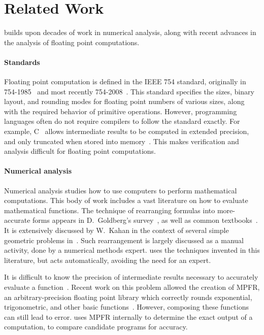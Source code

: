 \documentclass[paper.tex]{subfiles}
\begin{document}
\section{Related Work}
\label{sec:relatedwork}

\casio builds upon decades of work in numerical analysis,
  along with recent advances in the analysis
  of floating point computations.

\paragraph{Standards}
Floating point computation is defined in the IEEE 754 standard,
  originally in 754-1985~\cite{ieee85-standard}
  and most recently 754-2008~\cite{ieee08-standard}.
This standard specifies the sizes, binary layout, and rounding modes
  for floating point numbers of various sizes,
  along with the required behavior of primitive operations.
However, programming languages often
  do not require compilers to follow the standard exactly.
For example, C~\cite{c99} allows intermediate results
  to be computed in extended precision,
  and only truncated when stored into memory~\cite{toplas08-pitfalls-verifying}.
This makes verification and analysis difficult
  for floating point computations.

\paragraph{Numerical analysis}

Numerical analysis studies how to use computers
  to perform mathematical computations.
This body of work includes a vast literature
  on how to evaluate mathematical functions.
The technique of rearranging formulas into more-accurate forms
  appears in D.~Goldberg's survey~\cite{acm91-every-scientist},
  as well as common textbooks~\cite{book87-nmse}.
It is extensively discussed by W.~Kahan in the context
  of several simple geometric problems in~\cite{berkeley00-needle-like}.
Such rearrangement is largely discussed as a manual activity,
  done by a numerical methods expert.
\casio uses the techniques invented in this literature,
  but acts automatically, avoiding the need for an expert.

It is difficult to know the precision of intermediate results
  necessary to accurately evaluate a function~\cite{ensl03-table-maker}.
Recent work on this problem allowed the creation of MPFR,
  an arbitrary-precision floating point library
  which correctly rounds exponential, trigonometric, and other basic functions~\cite{acm07-mpfr}.
However, composing these functions can still lead to error.
\casio uses MPFR internally to determine
  the exact output of a computation,
  to compare candidate programs for accuracy.
\end{document}
